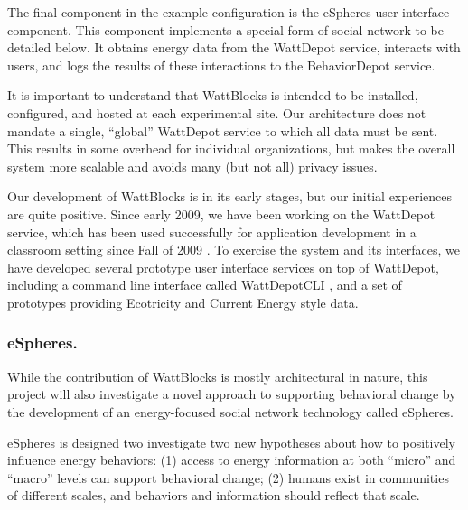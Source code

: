 The final component in the example configuration is the eSpheres user
interface component.  This component implements a special form of social
network to be detailed below. It obtains energy data from the WattDepot service,
interacts with users, and logs the results of these interactions to the
BehaviorDepot service.

It is important to understand that WattBlocks is intended to be installed,
configured, and hosted at each experimental site.  Our architecture does
not mandate a single, ``global'' WattDepot service to which all data
must be sent.  This results in some overhead for
individual organizations, but makes the overall system more scalable and
avoids many (but not all) privacy issues.


Our development of WattBlocks is in its early stages, but our initial
experiences are quite positive.  Since early 2009, we have been working on
the WattDepot service, which has been used successfully for application
development in a classroom setting since Fall of 2009 \cite{WattDepot}.  To
exercise the system and its interfaces, we have developed several prototype
user interface services on top of WattDepot, including a command line
interface called WattDepotCLI \cite{WattDepotCLI}, and a set of prototypes
providing Ecotricity \cite{Ecotricity} and Current Energy
\cite{CurrentEnergy} style data.




\subsubsection{eSpheres.}

While the contribution of WattBlocks is mostly architectural in nature,
this project will also investigate a novel approach to supporting
behavioral change by the development of an energy-focused social network
technology called eSpheres.

eSpheres is designed two investigate two new hypotheses about how to
positively influence energy behaviors: (1) access to energy information at
both ``micro'' and ``macro'' levels can support behavioral change; (2)
humans exist in communities of different scales, and behaviors and
information should reflect that scale.

